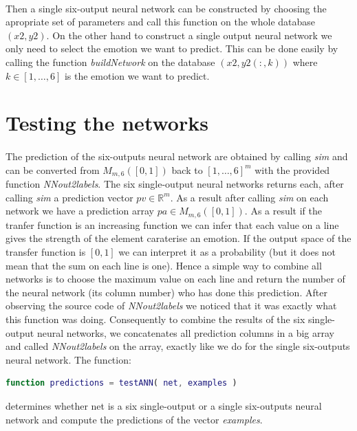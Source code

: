 \documentclass[a4paper,12pt,oneside,final]{report}
\newenvironment{changemargin}[2]{\begin{list}{}{%
\setlength{\topsep}{0pt}%
\setlength{\leftmargin}{0pt}%
\setlength{\rightmargin}{0pt}%
\setlength{\listparindent}{\parindent}%
\setlength{\itemindent}{\parindent}%
\setlength{\parsep}{0pt plus 1pt}%
\addtolength{\leftmargin}{#1}%
\addtolength{\rightmargin}{#2}%
}\item }{\end{list}}
\begin{document}
\paragraph{}
Then a single six-output neural network can be constructed by choosing the apropriate set of parameters and call this function on the whole database $(x2,y2)$. On the other hand to construct a single output neural network we only need to select the emotion we want to predict. This can be done easily by calling the function \textit{buildNetwork} on the database $(x2,y2(:,k))$ where $k\in[1,\hdots,6]$ is the emotion we want to predict.

\section{Testing the networks}
\paragraph{}
The prediction of the six-outputs neural network are obtained by calling \textit{sim} and can be converted from $M_{m,6}([0,1])$ back to $[1,\hdots,6]^m$ with the provided function \textit{NNout2labels}. The six single-output neural networks returns each, after calling \textit{sim} a prediction vector $pv\in \mathbb{R}^m$. As a result after calling \textit{sim} on each network we have a prediction array $pa\in M_{m,6}([0,1])$. As a result if the tranfer function is an increasing function we can infer that each value on a line gives the strength of the element caraterise an emotion. If the output space of the transfer function is $[0,1]$ we can interpret it as a probability (but it does not mean that the sum on each line is one). Hence a simple way to combine all networks is to choose the maximum value on each line and return the number of the neural network (its column number) who has done this prediction. After observing the source code of \textit{NNout2labels} we noticed that it was exactly what this function was doing. Consequently to combine the results of the six single-output neural networks, we concatenates all prediction columns in a big array and called \textit{NNout2labels} on the array, exactly like we do for the single six-outputs neural network. The function:
\begin{changemargin}{-5mm}{-5mm}
\begin{lstlisting}[language=Matlab, frame=single]
function predictions = testANN( net, examples )
\end{lstlisting}
\end{changemargin}
determines whether net is a six single-output or a single six-outputs neural network and compute the predictions of the vector \textit{examples}.
\end{document}
